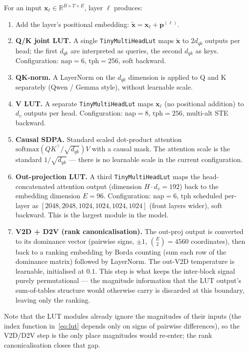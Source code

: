 \documentclass[11pt]{article}
\begin{document}
For an input $\mathbf{x}_\ell \in \mathbb{R}^{B \times T \times E}$, layer $\ell$ produces:
\begin{enumerate}
\setlength{\itemsep}{2pt}
    \item Add the layer's positional embedding: $\tilde{\mathbf{x}} = \mathbf{x}_\ell + \mathbf{p}^{(\ell)}$.
    \item \textbf{Q/K joint LUT.} A single \texttt{TinyMultiHeadLut} maps $\tilde{\mathbf{x}}$ to $2 d_{qk}$ outputs per head; the first $d_{qk}$ are interpreted as queries, the second $d_{qk}$ as keys. Configuration: $\text{nap}=6$, $\text{tph}=256$, soft backward.
    \item \textbf{QK-norm.} A LayerNorm on the $d_{qk}$ dimension is applied to Q and K separately (Qwen / Gemma style), without learnable scale.
    \item \textbf{V LUT.} A separate \texttt{TinyMultiHeadLut} maps $\mathbf{x}_\ell$ (no positional addition) to $d_v$ outputs per head. Configuration: $\text{nap}=8$, $\text{tph}=256$, multi-alt STE backward.
    \item \textbf{Causal SDPA.} Standard scaled dot-product attention $\text{softmax}(Q K^\top / \sqrt{d_{qk}}) V$ with a causal mask. The attention scale is the standard $1/\sqrt{d_{qk}}$ --- there is no learnable scale in the current configuration.
    \item \textbf{Out-projection LUT.} A third \texttt{TinyMultiHeadLut} maps the head-concatenated attention output (dimension $H \cdot d_v = 192$) back to the embedding dimension $E = 96$. Configuration: $\text{nap}=6$, $\text{tph}$ scheduled per-layer as $[2048, 2048, 1024, 1024, 1024, 1024]$ (front layers wider), soft backward. This is the largest module in the model.
    \item \textbf{V2D + D2V (rank canonicalisation).} The out-proj output is converted to its dominance vector (pairwise signs, $\pm 1$, $\binom{E}{2} = 4560$ coordinates), then back to a ranking embedding by Borda counting (sum each row of the dominance matrix) followed by LayerNorm. The out-V2D temperature is learnable, initialised at $0.1$. This step is what keeps the inter-block signal purely permutational --- the magnitude information that the LUT output's sum-of-tables structure would otherwise carry is discarded at this boundary, leaving only the ranking.
\end{enumerate}
Note that the LUT modules already ignore the magnitudes of their inputs (the index function in~\eqref{eq:lut} depends only on signs of pairwise differences), so the V2D/D2V step is the only place magnitudes would re-enter; the rank canonicalisation closes that gap.
\end{document}
